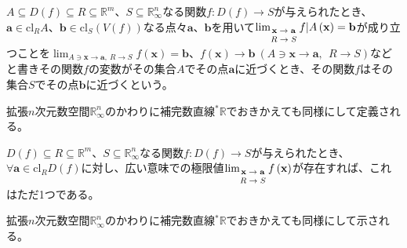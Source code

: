 \documentclass[dvipdfmx]{jsarticle}
\begin{document}
\begin{dfn}
$A \subseteq D(f) \subseteq R \subseteq \mathbb{R}^{m}$、$S \subseteq \mathbb{R}_{\infty}^{n}$なる関数$f:D(f) \rightarrow S$が与えられたとき、$\mathbf{a} \in \mathrm{cl}_{R}A$、$\mathbf{b} \in \mathrm{cl}_{S}\left( V(f) \right)$なる点々$\mathbf{a}$、$\mathbf{b}$を用いて$\lim_{\scriptsize \begin{matrix} \mathbf{x} \rightarrow \mathbf{a} \\ R \rightarrow S \\\end{matrix}}{f|A\left( \mathbf{x} \right)} = \mathbf{b}$が成り立つことを$\lim_{A \ni \mathbf{x} \rightarrow \mathbf{a} ,\ R \rightarrow S }{f\left( \mathbf{x} \right)} = \mathbf{b}$、$f\left( \mathbf{x} \right) \rightarrow \mathbf{b}\ \left( A \ni \mathbf{x} \rightarrow \mathbf{a},\ \ R \rightarrow S \right)$などと書きその関数$f$の変数がその集合$A$でその点$\mathbf{a}$に近づくとき、その関数$f$はその集合$S$でその点$\mathbf{b}$に近づくという。\par
拡張$n$次元数空間$\mathbb{R}_{\infty}^{n}$のかわりに補完数直線${}^{*}\mathbb{R}$でおきかえても同様にして定義される。
\end{dfn}
\begin{thm}\label{4.1.10.1}
$D(f) \subseteq R \subseteq \mathbb{R}^{m}$、$S \subseteq \mathbb{R}_{\infty}^{n}$なる関数$f:D(f) \rightarrow S$が与えられたとき、$\forall\mathbf{a} \in \mathrm{cl}_{R}{D(f)}$に対し、広い意味での極限値$\lim_{\scriptsize \begin{matrix} \mathbf{x} \rightarrow \mathbf{a} \\ R \rightarrow S \\\end{matrix}}{f\left( \mathbf{x} \right)}$が存在すれば、これはただ1つである。\par
拡張$n$次元数空間$\mathbb{R}_{\infty}^{n}$のかわりに補完数直線${}^{*}\mathbb{R}$でおきかえても同様にして示される。
\end{thm}
\end{document}
